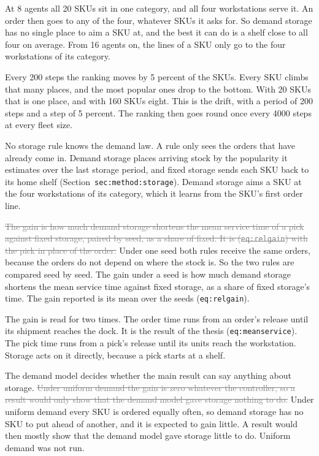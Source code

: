 \documentclass[11pt,a4paper]{article}
\newcommand{\new}[1]{\textcolor{newc}{#1}}
\newcommand{\old}[1]{\textcolor{gray}{\sout{#1}}}
\newenvironment{greenblock}{\color{newc}}{}
\newcommand{\lref}[1]{{\small\texttt{#1}}}
\begin{document}
\begin{greenblock}
At 8 agents all 20 SKUs sit in one category, and all four workstations serve
it. An order then goes to any of the four, whatever SKUs it asks for. So
demand storage has no single place to aim a SKU at, and the best it can do is
a shelf close to all four on average. From 16 agents on, the lines of a SKU
only go to the four workstations of its category.
\end{greenblock}

Every 200 steps the ranking moves by 5 percent of the SKUs. Every SKU climbs
that many places, and the most popular ones drop to the bottom. With 20 SKUs
that is one place, and with 160 SKUs eight. This is the drift, with a period
of 200 steps and a step of 5 percent. The ranking then goes round once every
4000 steps at every fleet size.

No storage rule knows the demand law. A rule only sees the orders that have
already come in. Demand storage places arriving stock by the popularity it
estimates over the last storage period, and fixed storage sends each SKU back
to its home shelf (Section~\lref{sec:method:storage}). \new{Demand storage
aims a SKU at the four workstations of its category, which it learns from the
SKU's first order line.}

\old{The gain is how much demand storage shortens the mean service time of a
pick against fixed storage, paired by seed, as a share of fixed. It is
(\lref{eq:relgain}) with the pick in place of the order.}
\begin{greenblock}
Under one seed both rules receive the same orders, because the orders do not
depend on where the stock is. So the two rules are compared seed by seed. The
gain under a seed is how much demand storage shortens the mean service time
against fixed storage, as a share of fixed storage's time. The gain reported
is its mean over the seeds (\lref{eq:relgain}).

The gain is read for two times. The order time runs from an order's release
until its shipment reaches the dock. It is the result of the thesis
(\lref{eq:meanservice}). The pick time runs from a pick's release until its
units reach the workstation. Storage acts on it directly, because a pick
starts at a shelf.
\end{greenblock}

The demand model decides whether the main result can say anything about
storage. \old{Under uniform demand the gain is zero whatever the controller,
so a result would only show that the demand model gave storage nothing to
do.}
\new{Under uniform demand every SKU is ordered equally often, so demand
storage has no SKU to put ahead of another, and it is expected to gain little.
A result would then mostly show that the demand model gave storage little to
do. Uniform demand was not run.}
\end{document}
